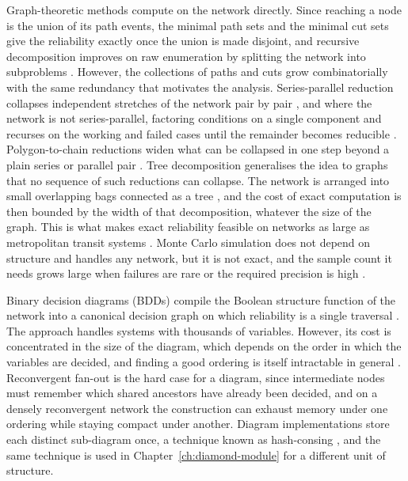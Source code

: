 \documentclass[12pt]{report}
\begin{document}
Graph-theoretic methods compute on the network directly. Since reaching a node is the union of
its path events, the minimal path sets and the minimal cut sets give the reliability exactly
once the union is made disjoint, and recursive decomposition improves on raw enumeration by
splitting the network into subproblems \cite{liu2012improved,kim2013network}. However, the
collections of paths and cuts grow combinatorially with the same redundancy that motivates the
analysis.
Series-parallel reduction collapses independent stretches of the network pair by pair
\cite{satyanarayana1985linear}, and where the network is not series-parallel, factoring
conditions on a single component and recurses on the working and failed cases until the
remainder becomes reducible \cite{moore1956reliable,satyanarayana1983factoring,page1988practical}.
Polygon-to-chain reductions widen what can be collapsed in one step beyond a plain series or
parallel pair \cite{wood1985polygon}. Tree decomposition generalises the idea to graphs that no
sequence of such reductions can collapse. The network is arranged into small overlapping bags
connected as a tree \cite{robertson1986graphminors}, and the cost of exact computation is then
bounded by the width of that decomposition, whatever the size of the graph. This is what makes
exact reliability feasible on networks as large as metropolitan transit systems
\cite{goharshady2020treewidth}. Monte Carlo simulation does not depend on structure and handles any network, but it is
not exact, and the sample count it needs grows large when failures are rare or the required
precision is high \cite{fishman1986comparison}.

Binary decision diagrams (BDDs) compile the Boolean structure function of the network into a
canonical decision graph on which reliability is a single traversal
\cite{bryant1986graph,rauzy1993new}. The approach handles systems with thousands of variables.
However, its cost is concentrated in the size of the diagram, which depends on the order in which the
variables are decided, and finding a good ordering is itself intractable in general
\cite{bryant2002ordered}. Reconvergent fan-out is the hard case for a diagram, since intermediate
nodes must remember which shared ancestors have already been decided, and on a densely
reconvergent network the construction can exhaust memory under one ordering while staying
compact under another. Diagram implementations store each distinct sub-diagram once, a technique
known as hash-consing \cite{ershov1958programming,filliatre2006hashconsing}, and the same
technique is used in Chapter~\ref{ch:diamond-module} for a different unit of structure.
\end{document}
